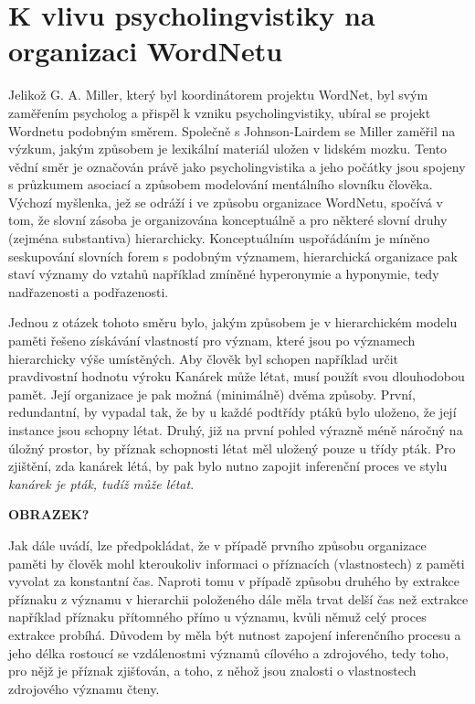 \documentclass[a4paper, 11pt, oneside]{book}
\newcommand\ex{\textsf}
\begin{document}

			\section{K vlivu psycholingvistiky na organizaci WordNetu}
			\label{cha:psycho}

				Jelikož G. A. Miller, který byl koordinátorem projektu WordNet, byl svým zaměřením psycholog a přispěl k vzniku psycholingvistiky, ubíral se projekt Wordnetu podobným směrem. Společně s Johnson-Lairdem se Miller zaměřil na výzkum, jakým způsobem je lexikální materiál uložen v lidském mozku. Tento vědní směr je označován právě jako psycholingvistika a jeho počátky jsou spojeny s průzkumem asociací a způsobem modelování mentálního slovníku člověka. Výchozí myšlenka, jež se odráží i ve způsobu organizace WordNetu, spočívá v tom, že slovní zásoba je organizována konceptuálně a pro některé slovní druhy (zejména substantiva) hierarchicky. Konceptuálním uspořádáním je míněno seskupování slovních forem s podobným významem, hierarchická organizace pak staví významy do vztahů například zmíněné hyperonymie a hyponymie, tedy nadřazenosti a podřazenosti.

				Jednou z otázek tohoto směru bylo, jakým způsobem je v hierarchickém modelu paměti řešeno získávání vlastností pro význam, které jsou  po významech hierarchicky výše umístěných. Aby člověk byl schopen například určit pravdivostní hodnotu výroku \ex{Kanárek může létat}, musí použít svou dlouhodobou pamět. Její organizace je pak možná (minimálně) dvěma způsoby. První, redundantní, by vypadal tak, že by u každé podtřídy ptáků bylo uloženo, že její instance jsou schopny létat. Druhý, již na první pohled výrazně méně náročný na úložný prostor, by příznak schopnosti létat měl uložený pouze u třídy \ex{pták}. Pro zjištění, zda kanárek létá, by pak bylo nutno zapojit inferenční proces ve stylu \textit{kanárek je pták, tudíž může létat}. \parencite{collins1969retrieval}

				\textbf{OBRAZEK?}

				Jak \textcite{collins1969retrieval} dále uvádí, lze předpokládat, že v případě prvního způsobu organizace paměti by člověk mohl kteroukoliv informaci o příznacích (vlastnostech) z paměti vyvolat za konstantní čas. Naproti tomu v případě způsobu druhého by extrakce příznaku z významu v hierarchii položeného dále měla trvat delší čas než extrakce například příznaku přítomného přímo u významu, kvůli němuž celý proces extrakce probíhá. Důvodem by měla být nutnost zapojení inferenčního procesu a jeho délka rostoucí se vzdálenostmi významů cílového a zdrojového, tedy toho, pro nějž je příznak zjišťován, a toho, z něhož jsou znalosti o vlastnostech zdrojového významu čteny.
\end{document}
